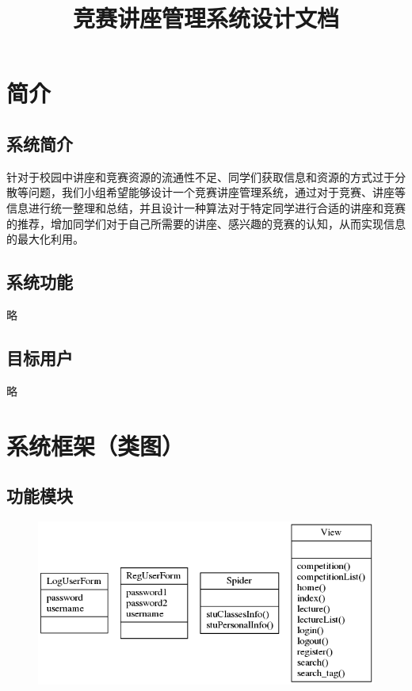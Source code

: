 \documentclass[UTF8]{ctexart}
\date{}
\title{\textbf{竞赛讲座管理系统设计文档}}
\author{\rightline{SigmaGo小组}}
\begin{document}
\begin{spacing}{1.3}
\maketitle


\section{简介}

\subsection{系统简介}
针对于校园中讲座和竞赛资源的流通性不足、同学们获取信息和资源的方式过于分散等问题，我们小组希望能够设计一个竞赛讲座管理系统，通过对于竞赛、讲座等信息进行统一整理和总结，并且设计一种算法对于特定同学进行合适的讲座和竞赛的推荐，增加同学们对于自己所需要的讲座、感兴趣的竞赛的认知，从而实现信息的最大化利用。

\subsection{系统功能}
略

\subsection{目标用户}
略

\section{系统框架（类图）}

\subsection{功能模块}
		\begin{figure}[H]
				\centering
				\includegraphics[width=\textwidth]{classes_view.png}
		\end{figure}


\end{spacing}
\end{document}
